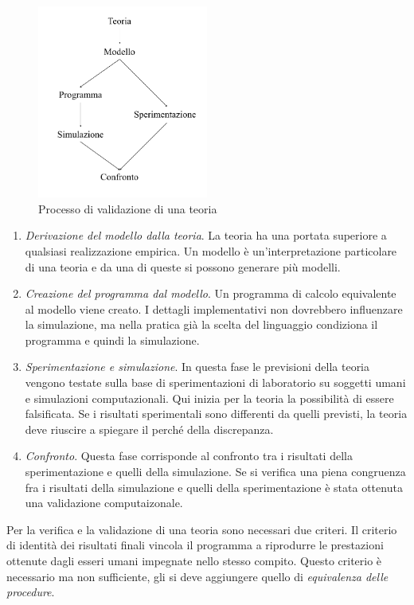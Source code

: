 \begin{figure}[hbt]
  \centering
  \includegraphics[width=0.5\textwidth]{img/validazioneTeoria}
  \caption{Processo di validazione di una teoria}
  \label{fig:validazioneTeoria}
\end{figure}

\begin{enumerate}
  \item \emph{Derivazione del modello dalla teoria}. La teoria ha una portata superiore a qualsiasi realizzazione empirica. Un modello è un’interpretazione particolare di una teoria e da una di queste si possono generare più modelli.
  \item \emph{Creazione del programma dal modello}. Un programma di calcolo equivalente al modello viene creato. I dettagli implementativi non dovrebbero influenzare la simulazione, ma nella pratica già la scelta del linguaggio condiziona il programma e quindi la simulazione.
  \item \emph{Sperimentazione e simulazione}. In questa fase le previsioni della teoria vengono testate sulla base di sperimentazioni di laboratorio su soggetti umani e simulazioni computazionali. Qui inizia per la teoria la possibilità di essere falsificata. Se i risultati sperimentali sono differenti da quelli previsti, la teoria deve riuscire a spiegare il perché della discrepanza.
  \item \emph{Confronto}. Questa fase corrisponde al confronto tra i risultati della sperimentazione e quelli della simulazione. Se si verifica una piena congruenza fra i risultati della simulazione e quelli della sperimentazione è stata ottenuta una validazione computaizonale.
\end{enumerate}

Per la verifica e la validazione di una teoria sono necessari due criteri. Il criterio di identità dei risultati finali vincola il programma a riprodurre le prestazioni ottenute dagli esseri umani impegnate nello stesso compito. Questo criterio è necessario ma non sufficiente, gli si deve aggiungere quello di \emph{equivalenza delle procedure}.

